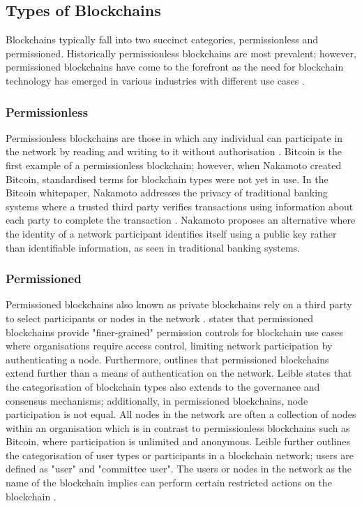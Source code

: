 \subsection{Types of Blockchains}

Blockchains typically fall into two succinct categories, permissionless and permissioned. Historically permissionless blockchains are most prevalent; however, permissioned blockchains have come to the forefront as the need for blockchain technology has emerged in various industries with different use cases \autocite{yagaBlockchainTechnologyOverview2018}. 

\subsubsection{Permissionless}

Permissionless blockchains are those in which any individual can participate in the network by reading and writing to it without authorisation \autocite{yagaBlockchainTechnologyOverview2018}.
Bitcoin is the first example of a permissionless blockchain; however, when Nakamoto created Bitcoin, standardised terms for blockchain types were not yet in use. In the Bitcoin whitepaper, Nakamoto addresses the privacy of traditional banking systems where a trusted third party verifies transactions using information about each party to complete the transaction \autocite{nakamotoBitcoinPeertoPeerElectronic2008}. Nakamoto proposes an alternative where the identity of a network participant identifies itself using a public key rather than identifiable information, as seen in traditional banking systems. 

\subsubsection{Permissioned}

Permissioned blockchains also known as private blockchains rely on a third party to select participants or nodes in the network \autocite{imteajIntroductionBlockchainTechnology2021}.\autocite{yagaBlockchainTechnologyOverview2018} states that permissioned blockchains provide "finer-grained" permission controls for blockchain use cases where organisations require access control, limiting network participation by authenticating a node. Furthermore, \autocite{leibleReviewBlockchainTechnology2019} outlines that permissioned blockchains extend further than a means of authentication on the network. Leible states that the categorisation of blockchain types also extends to the governance and consensus mechanisms; additionally, in permissioned blockchains, node participation is not equal. All nodes in the network are often a collection of nodes within an organisation which is in contrast to permissionless blockchains such as Bitcoin, where participation is unlimited and anonymous. Leible further outlines the categorisation of user types or participants in a blockchain network; users are defined as "user" and "committee user". The users or nodes in the network as the name of the blockchain implies can perform certain restricted actions on the blockchain \autocite{butijnBlockchainsSystematicMultivocal2020} \autocite{rajasekaranComprehensiveSurveyBlockchain2022}.

